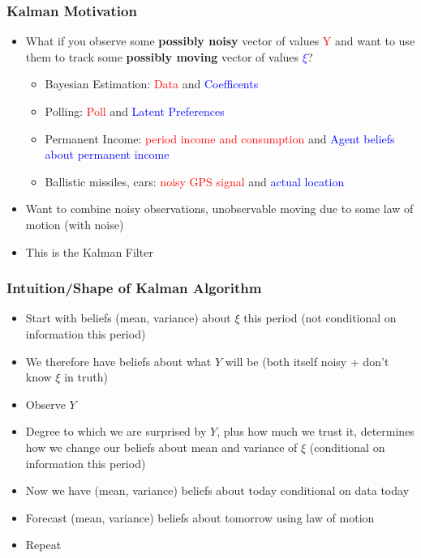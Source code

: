 \documentclass{beamer}
\begin{document}
\begin{frame}
\frametitle[alignment=center]{Kalman Motivation}
\begin{itemize}
\item What if you observe some \textbf{possibly noisy} vector of values \textcolor{red}{Y} and want to use them to track some \textbf{possibly moving} vector of values \textcolor{blue}{$\xi$}?
\begin{itemize}
\item Bayesian Estimation: \textcolor{red}{Data} and \textcolor{blue}{Coefficents}
\bigskip
\item Polling: \textcolor{red}{Poll} and \textcolor{blue}{Latent Preferences}
\bigskip
\item Permanent Income: \textcolor{red}{period income and consumption} and \textcolor{blue}{Agent beliefs about permanent income}
\bigskip
\item Ballistic missiles, cars: \textcolor{red}{noisy GPS signal} and \textcolor{blue}{actual location}
\end{itemize}
\bigskip
\item Want to combine noisy observations, unobservable moving due to some law of motion (with noise)
\bigskip
\item This is the Kalman Filter 
\end{itemize}
\end{frame}

\begin{frame}
\frametitle[alignment=center]{Intuition/Shape of Kalman Algorithm}
\begin{itemize}
\item Start with beliefs (mean, variance) about $\xi$ this period (not conditional on information this period)
\bigskip
\item We therefore have beliefs about what $Y$ will be (both itself noisy + don't know $\xi$ in truth)
\bigskip
\item Observe $Y$
\bigskip
\item Degree to which we are surprised by $Y$, plus how much we trust it, determines how we change our beliefs about mean and variance of $\xi$ (conditional on information this period)
\bigskip
\item Now we have (mean, variance) beliefs about today conditional on data today
\bigskip
\item Forecast (mean, variance) beliefs about tomorrow using law of motion
\bigskip
\item Repeat
\end{itemize}
\end{frame}
\end{document}
